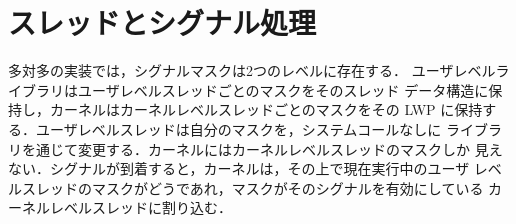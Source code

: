 \documentclass[../main.tex]{subfiles}
\begin{document}
\section{スレッドとシグナル処理}
\label{sec:l05-thread-signals}

多対多の実装では，シグナルマスクは2つのレベルに存在する．%
ユーザレベルライブラリはユーザレベルスレッドごとのマスクをそのスレッド
データ構造に保持し，カーネルはカーネルレベルスレッドごとのマスクをその LWP
に保持する．ユーザレベルスレッドは自分のマスクを，システムコールなしに
ライブラリを通じて変更する．カーネルにはカーネルレベルスレッドのマスクしか
見えない．シグナルが到着すると，カーネルは，その上で現在実行中のユーザ
レベルスレッドのマスクがどうであれ，マスクがそのシグナルを有効にしている
カーネルレベルスレッドに割り込む．
\end{document}
